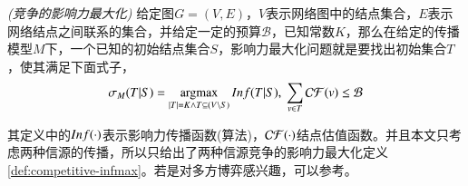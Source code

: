 \begin{definition}
\emph{(竞争的影响力最大化)}
\label{def:competitive-infmax}
给定图$G=(V, E)$，$V$表示网络图中的结点集合，$E$表示网络结点之间联系的集合，并给定一定的预算$\mathcal{B}$，已知常数$K$，那么在给定的传播模型$M$下，一个已知的初始结点集合$S$，影响力最大化问题就是要找出初始集合$T$，使其满足下面式子，
\begin{displaymath}
\sigma_{M}(T|S) = \mathop{\rm argmax} \limits_{|T|=K \wedge T \subseteq (V \setminus S)} Inf(T|S), ~ \sum_{v \in T} \mathcal{CF}(v) \leq \mathcal{B}
\end{displaymath}
\end{definition}

其定义中的$Inf(\boldmath\cdot)$表示影响力传播函数(算法)，$\mathcal{CF}(\boldmath\cdot)$结点估值函数。并且本文只考虑两种信源的传播，所以只给出了两种信源竞争的影响力最大化定义\ref{def:competitive-infmax}。若是对多方博弈感兴趣，可以参考\cite{bharathi2007competitive}。


